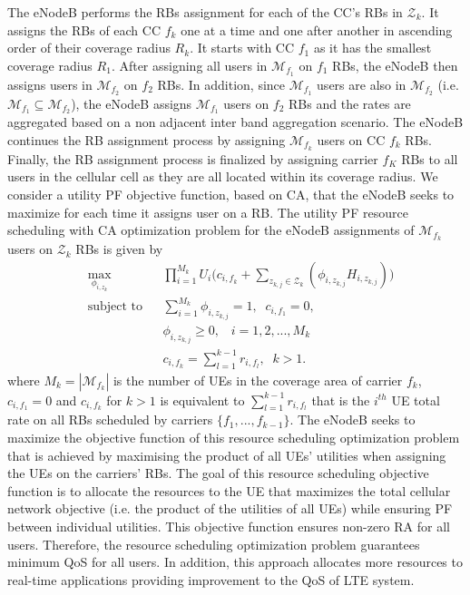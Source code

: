 \documentclass[conference]{IEEEtran}
\begin{document}
The eNodeB performs the RBs assignment for each of the CC's RBs in $\mathcal{Z}_k$. It assigns the RBs of each CC $f_k$ one at a time and one after another in ascending order of their coverage radius $R_k$. It starts with CC $f_1$ as it has the smallest coverage radius $R_1$. After assigning all users in $\mathcal{M}_{f_1}$ on $f_1$ RBs, the eNodeB then assigns users in $\mathcal{M}_{f_2}$ on $f_2$ RBs. In addition, since $\mathcal{M}_{f_1}$ users are also in $\mathcal{M}_{f_2}$ (i.e. $\mathcal{M}_{f_1} \subseteq \mathcal{M}_{f_2}$), the eNodeB assigns $\mathcal{M}_{f_1}$ users on $f_2$ RBs and the rates are aggregated based on a non adjacent inter band aggregation scenario. The eNodeB continues the RB assignment process by assigning $\mathcal{M}_{f_k}$ users on CC $f_k$ RBs. Finally, the RB assignment process is finalized by assigning carrier $f_K$ RBs to all users in the cellular cell as they are all located within its coverage radius. We consider a utility PF objective function, based on CA, that the eNodeB seeks to maximize for each time it assigns user on a RB. The utility PF resource scheduling with CA optimization problem for the eNodeB assignments of $\mathcal{M}_{f_k}$ users on $\mathcal{Z}_k$ RBs is given by
\begin{equation}\label{eqn:utility_fairness_CA}
\begin{aligned}
& \underset{\textbf{$\phi_{i,z_k}$}} {\text{max}}
& & \prod_{i=1}^{M_k} U_i\Big (c_{i,f_k}+\sum_{z_{k,j}\in \mathcal{Z}_k}(\phi_{i,z_{k,j}} H_{i,z_{k,j}})\Big ) \\
& \text{subject to}
& & \sum_{i=1}^{M_k}\phi_{i,z_{k,j}} =1, \;\;c_{i,f_1} = 0,\\
& & &  \phi_{i,z_{k,j}} \geq 0, \;\;\; i = 1,2, ...,M_k\\
& & &  c_{i,f_k} = \sum_{l=1}^{k-1}r_{i,f_l}, \;\; k>1.
\end{aligned}
\end{equation}
where $M_k=|\mathcal{M}_{f_k}|$ is the number of UEs in the coverage area of carrier $f_k$,
$c_{i,f_1}=0$ and $c_{i,f_k}$ for $k>1$ is equivalent to $\sum_{l=1}^{k-1}r_{i,f_l}$ that is the $i^{th}$ UE total rate on all RBs scheduled by carriers $\{f_1,...,f_{k-1}\}$. The eNodeB seeks to maximize the objective function of this resource scheduling optimization problem that is achieved by maximising the product of all UEs' utilities when assigning the UEs on the carriers' RBs. The goal of this resource scheduling objective function is to allocate the resources to the UE that maximizes the total cellular network objective (i.e. the product of the utilities of all UEs) while ensuring PF between individual utilities. This objective function ensures non-zero RA for all users. Therefore, the resource scheduling optimization problem guarantees minimum QoS for all users. In addition, this approach allocates more resources to real-time applications providing improvement to the QoS of LTE system.
\end{document}
